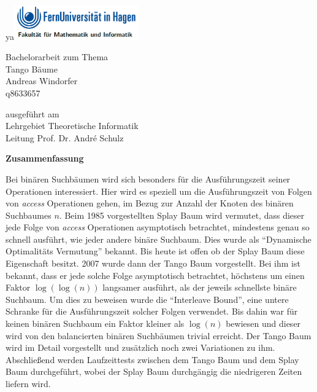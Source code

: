 \documentclass[a4paper,12pt]{article}
\begin{document}
\begin{center}
ya\includegraphics[width= 0.4\textwidth]{Medien/kleinkram/UniLogo}
\end{center}
\bigskip


 \begin{center}
 	\LARGE{Bachelorarbeit zum Thema\\
 	Tango Bäume}\\
 \bigskip
 \bigskip
 \bigskip
 \bigskip
\bigskip
\bigskip 
\bigskip
\bigskip
 \large{
 Andreas Windorfer\\
 q8633657}
 \end{center}
 \bigskip
 \bigskip
 \bigskip
 \bigskip 
 \bigskip
 \bigskip
 \bigskip 
  \bigskip 
 \bigskip
 \bigskip
 \bigskip 
  \begin{center}
 ausgeführt am\\
 Lehrgebiet Theoretische Informatik\\
 Leitung Prof. Dr. André Schulz\\
\end{center}

\author{Andreas Windorfer}





\newpage
\begin{center}
\textbf{Zusammenfassung}
\end{center}
 Bei binären Suchbäumen wird sich besonders für die Ausführungszeit seiner Operationen  interessiert. Hier wird es speziell um die Ausführungszeit von Folgen von \textit{access} Operationen gehen, im Bezug zur Anzahl der Knoten des binären Suchbaumes $n$. Beim 1985  vorgestellten Splay Baum \cite{splay} wird vermutet, dass dieser jede Folge von  \textit{access} Operationen asymptotisch betrachtet, mindestens genau so schnell ausführt, wie jeder andere binäre Suchbaum. Dies wurde als \enquote{Dynamische Optimalitäts Vermutung} bekannt. Bis heute ist offen ob der Splay Baum diese Eigenschaft besitzt.  2007 wurde dann der Tango Baum  \cite{demainDinamicOpti} vorgestellt. Bei ihm ist bekannt, dass er jede solche Folge asymptotisch betrachtet, höchstens um einen Faktor $\log\left(\log\left(n\right)\right)$ langsamer ausführt, als der jeweils schnellste binäre Suchbaum. Um dies zu beweisen wurde die \enquote{Interleave Bound}, eine untere Schranke für die Ausführungszeit solcher Folgen verwendet.  Bis dahin war für keinen binären Suchbaum ein Faktor kleiner als $\log\left(n\right)$ bewiesen und dieser wird von den balancierten binären Suchbäumen trivial erreicht. Der Tango Baum wird im Detail vorgestellt und zusätzlich noch zwei Variationen zu ihm. Abschließend werden Laufzeittests zwischen dem Tango Baum und dem Splay Baum durchgeführt, wobei der Splay Baum durchgängig die niedrigeren Zeiten liefern wird. 
\newpage
\tableofcontents
\newpage
\end{document}
